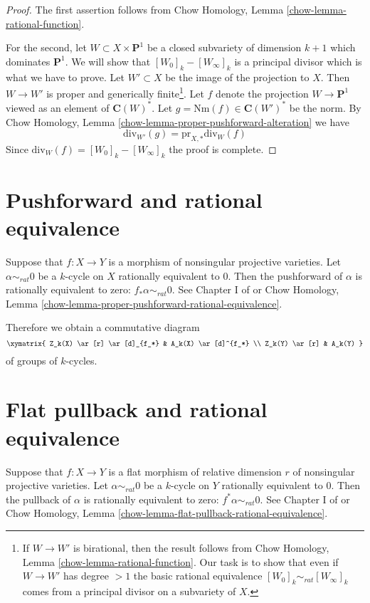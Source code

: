 \begin{proof}
The first assertion follows from
Chow Homology, Lemma \ref{chow-lemma-rational-function}.

\medskip\noindent
For the second, let $W \subset X \times \mathbf{P}^1$ be a closed
subvariety of dimension $k + 1$ which dominates $\mathbf{P}^1$.
We will show that $[W_0]_k - [W_\infty]_k$ is a principal divisor
which is what we have to prove. Let $W' \subset X$ be the image of
the projection to $X$. Then $W \to W'$ is proper and generically
finite\footnote{If $W \to W'$ is birational, then the result follows
from Chow Homology, Lemma \ref{chow-lemma-rational-function}.
Our task is to show that even if $W \to W'$
has degree $>1$ the basic rational equivalence
$[W_0]_k \sim_{rat} [W_\infty]_k$ comes from a principal divisor
on a subvariety of $X$.}. Let $f$ denote the projection $W \to \mathbf{P}^1$
viewed as an element of $\mathbf{C}(W)^*$. Let
$g = \text{Nm}(f) \in \mathbf{C}(W')^*$ be the norm. By
Chow Homology, Lemma \ref{chow-lemma-proper-pushforward-alteration} we have
$$
\text{div}_{W'}(g) = \text{pr}_{X, *}\text{div}_W(f)
$$
Since $\text{div}_W(f) = [W_0]_k - [W_\infty]_k$ the proof is complete.
\end{proof}


\section{Pushforward and rational equivalence}
\label{section-pushforward-and-rational-equivalence}

\noindent
Suppose that $f : X \to Y$ is a morphism of nonsingular projective varieties.
Let $\alpha \sim_{rat} 0$ be a $k$-cycle on
$X$ rationally equivalent to $0$. Then the {pushforward}
of $\alpha$ is rationally equivalent to zero:
$f_* \alpha \sim_{rat} 0$. See Chapter I of \cite{F} or
Chow Homology, Lemma \ref{chow-lemma-proper-pushforward-rational-equivalence}.

\medskip\noindent
Therefore we obtain a commutative diagram
$$
\xymatrix{
Z_k(X) \ar[r] \ar[d]_{f_*} & A_k(X) \ar[d]^{f_*} \\
Z_k(Y) \ar[r] & A_k(Y)
}
$$
of groups of $k$-cycles.


\section{Flat pullback and rational equivalence}
\label{section-flat-pullback-and-rational-equivalence}

\noindent
Suppose that $f : X \to Y$ is a flat morphism of relative dimension $r$
of nonsingular projective varieties.
Let $\alpha \sim_{rat} 0$ be a $k$-cycle on
$Y$ rationally equivalent to $0$. Then the pullback
of $\alpha$ is rationally equivalent to zero:
$f^* \alpha \sim_{rat} 0$. See Chapter I of \cite{F} or
Chow Homology, Lemma \ref{chow-lemma-flat-pullback-rational-equivalence}.

